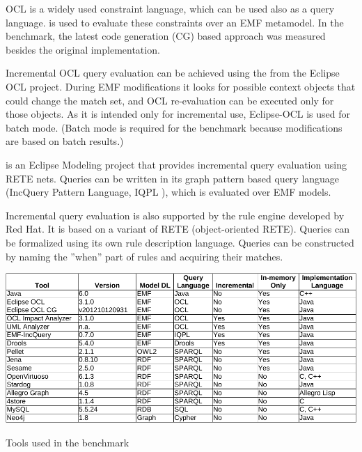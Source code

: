 OCL \cite{omg-ocl} is a widely used constraint language, which can be used also
as a query language.  \cite{EclipseOCL} is used to evaluate
these constraints over an EMF metamodel. In the benchmark, the latest code
generation (CG) based approach \cite{ocl-cg} was measured besides the original
implementation.

Incremental OCL query evaluation can be achieved using the  \cite{ocl-ia} from the Eclipse OCL project. During EMF modifications
it looks for possible context objects that could change the match set, and OCL
re-evaluation can be executed only for those objects. As it is intended only for
incremental use, Eclipse-OCL is used for batch mode. (Batch mode is required for
the benchmark because modifications are based on batch results.)


 \cite{models10} is an Eclipse Modeling project that
provides incremental query evaluation using RETE \cite{rete} nets. Queries can
be written in its graph pattern based query language (IncQuery Pattern Language,
IQPL \cite{iqpl}), which is evaluated over EMF models.

Incremental query evaluation is also supported by the 
\cite{Drools} rule engine developed by Red Hat. It is based on a variant of RETE \cite{rete}
(object-oriented RETE). Queries can be formalized using its own rule description
language. Queries can be constructed by naming the ''when'' part of rules and
acquiring their matches.



\begin{table}[Hh]
\includegraphics[width=\columnwidth]{figures/tools.pdf}
\caption{Tools used in the benchmark}
\label{table:tools}
\end{table}

